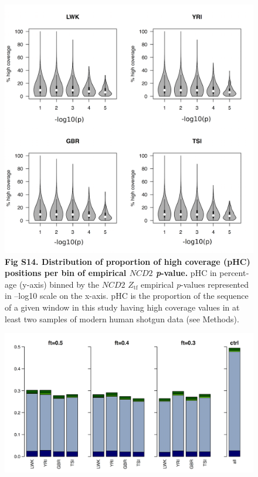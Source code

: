 \begin{refsection}
\begin{otherlanguage}{english}
\begin{figure}[]
\centering
\includegraphics[]{chap2_folder/supp_figures/S14_Fig.png}
\caption*{\textbf{Fig S14. Distribution of proportion of high coverage (pHC) positions per bin of empirical $NCD2$ \emph{p}-value.}  
pHC in percentage (y-axis) binned by the $NCD2$ $Z_{\mathrm{tf}}$ empirical \emph{p}-values represented in –log10 scale on the x-axis. pHC is the proportion of the sequence of a given window in this study having high coverage values in at least two samples of modern human shotgun data (see Methods). 
}
\end{figure}
%
\begin{figure}[h]
\centering
\includegraphics[]{chap2_folder/supp_figures/S15_Fig.png}

\end{figure}
\end{otherlanguage}
\end{refsection}
